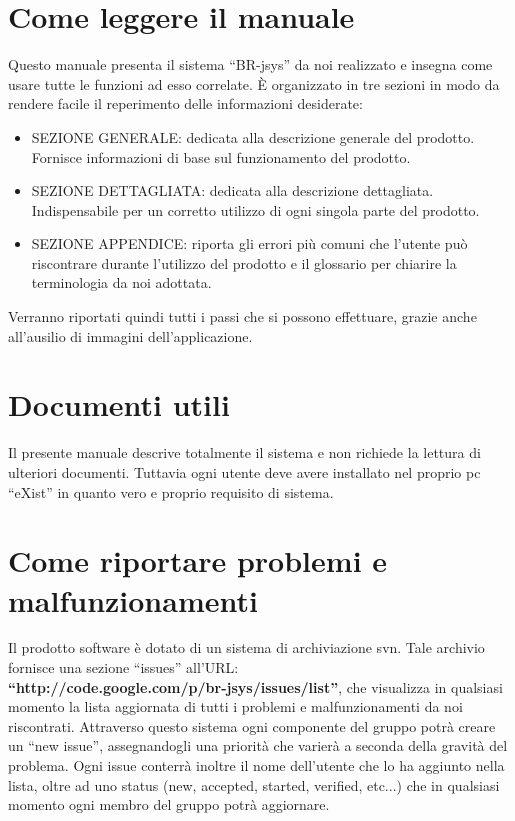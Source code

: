 \section{Come leggere il manuale}
Questo manuale presenta il sistema ``BR-jsys'' da noi realizzato e insegna come usare tutte le funzioni ad esso correlate. \`E organizzato in tre sezioni in modo da rendere facile il reperimento delle informazioni desiderate:
\begin{itemize}
\item SEZIONE GENERALE: dedicata alla descrizione generale del prodotto. Fornisce informazioni di base sul funzionamento del prodotto.
\item SEZIONE DETTAGLIATA: dedicata alla descrizione dettagliata. Indispensabile per un corretto utilizzo di ogni singola parte del prodotto.
\item SEZIONE APPENDICE: riporta gli errori pi\`u comuni che l'utente pu\`o riscontrare durante l'utilizzo del prodotto e il glossario per chiarire la terminologia da noi adottata.
\end{itemize}
Verranno riportati quindi tutti i passi che si possono effettuare, grazie anche all'ausilio di immagini dell'applicazione.
\section{Documenti utili}
Il presente manuale descrive totalmente il sistema e non richiede la lettura di ulteriori documenti. Tuttavia ogni utente deve avere installato nel proprio pc ``eXist'' in quanto vero e proprio requisito di sistema. 
\section{Come riportare problemi e malfunzionamenti}
Il prodotto software \`e dotato di un sistema di archiviazione svn. Tale archivio fornisce una sezione ``issues'' all'URL: \\ 
\textbf{``http://code.google.com/p/br-jsys/issues/list''}, che visualizza in qualsiasi momento la lista aggiornata di tutti i problemi e malfunzionamenti da noi riscontrati. Attraverso questo sistema ogni componente del gruppo potr\`a creare un ``new issue'', assegnandogli una priorit\`a che varier\`a a seconda della gravit\`a del problema. Ogni issue conterr\`a inoltre il nome dell'utente che lo ha aggiunto nella lista, oltre ad uno status (new, accepted, started, verified, etc...) che in qualsiasi momento ogni membro del gruppo potr\`a aggiornare. 



